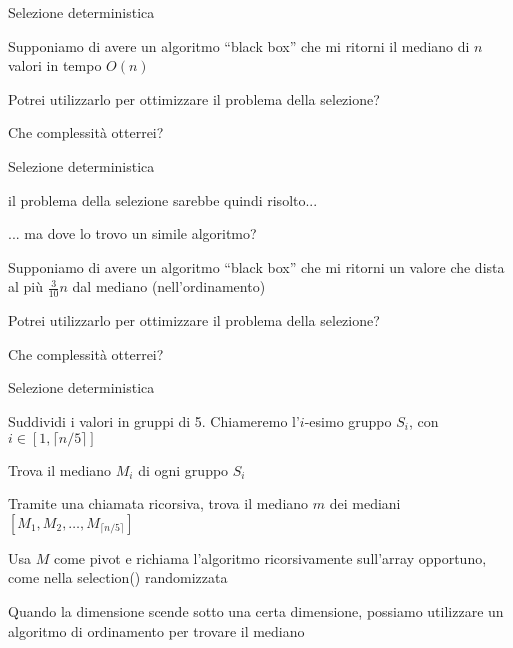 \begin{frame}{Selezione deterministica}

Supponiamo di avere un algoritmo “black box” che mi ritorni il mediano di $n$ valori in tempo $O(n)$

\bigskip
{}
\BIL
\item Potrei utilizzarlo per ottimizzare il problema della selezione?
\item Che complessità otterrei?
\EIL

\end{frame}

\begin{frame}{Selezione deterministica}

\BIL
\item il problema della selezione sarebbe quindi risolto...
\item ... ma dove lo trovo un simile algoritmo?
\EIL

\bigskip
{}
\BIL
\item Supponiamo di avere un algoritmo “black box” che mi ritorni un valore che dista al più $\frac{3}{10}n$ dal mediano (nell'ordinamento)
\item Potrei utilizzarlo per ottimizzare il problema della selezione?
\item Che complessità otterrei?
\EIL

\end{frame}

\begin{frame}{Selezione deterministica}

\BIL
\item Suddividi i valori in gruppi di 5. Chiameremo l'$i$-esimo gruppo $S_i$, con $i \in \left[1, \lceil n/5 \rceil \right]$
\item Trova il mediano $M_i$ di ogni gruppo $S_i$
\item Tramite una chiamata ricorsiva, trova il mediano $m$ dei mediani
$[M_1, M_2, \ldots, M_{\lceil n/5 \rceil}]$
\item Usa $M$ come pivot e richiama l'algoritmo ricorsivamente sull'array opportuno, come nella \textsf{selection}() randomizzata
\item Quando la dimensione scende sotto una certa dimensione, possiamo
utilizzare un algoritmo di ordinamento per trovare il mediano
\EIL

\end{frame}

